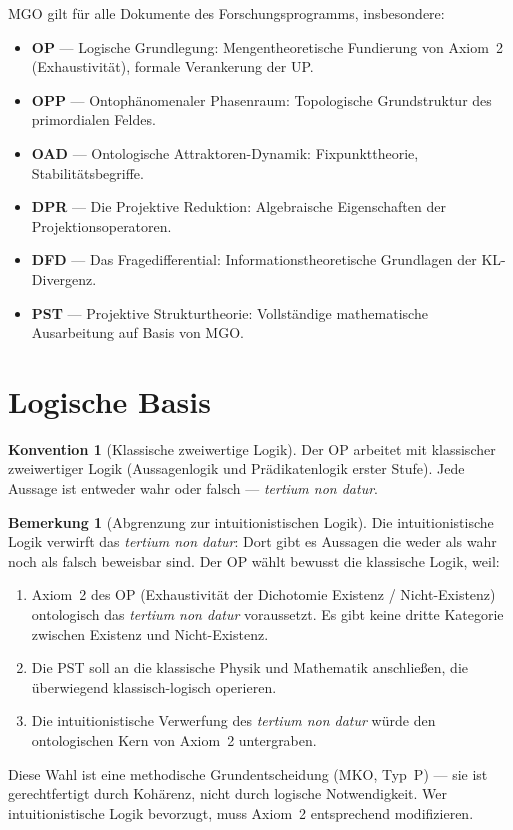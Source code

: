 \documentclass[11pt,a4paper]{article}
\theoremstyle{plain}
\theoremstyle{definition}
\newtheorem{remark}{Bemerkung}[section]
\newtheorem{konvention}{Konvention}[section]
\begin{document}
MGO gilt f\"{u}r alle Dokumente des Forschungsprogramms, insbesondere:
\begin{itemize}
  \item \textbf{OP} --- Logische Grundlegung: Mengentheoretische Fundierung von
        Axiom~2 (Exhaustivit\"{a}t), formale Verankerung der UP.
  \item \textbf{OPP} --- Ontoph\"{a}nomenaler Phasenraum: Topologische Grundstruktur
        des primordialen Feldes.
  \item \textbf{OAD} --- Ontologische Attraktoren-Dynamik: Fixpunkttheorie,
        Stabilit\"{a}tsbegriffe.
  \item \textbf{DPR} --- Die Projektive Reduktion: Algebraische Eigenschaften der
        Projektionsoperatoren.
  \item \textbf{DFD} --- Das Fragedifferential: Informationstheoretische Grundlagen
        der KL-Divergenz.
  \item \textbf{PST} --- Projektive Strukturtheorie: Vollst\"{a}ndige mathematische
        Ausarbeitung auf Basis von MGO.
\end{itemize}

\section{Logische Basis}

\begin{konvention}[Klassische zweiwertige Logik]
Der OP arbeitet mit klassischer zweiwertiger Logik (Aussagenlogik und
Pr\"{a}dikatenlogik erster Stufe). Jede Aussage ist entweder wahr oder falsch ---
\emph{tertium non datur}.
\end{konvention}

\begin{remark}[Abgrenzung zur intuitionistischen Logik]
Die intuitionistische Logik verwirft das \emph{tertium non datur}: Dort gibt es
Aussagen die weder als wahr noch als falsch beweisbar sind. Der OP w\"{a}hlt bewusst
die klassische Logik, weil:

\begin{enumerate}
  \item Axiom~2 des OP (Exhaustivit\"{a}t der Dichotomie Existenz / Nicht-Existenz)
        ontologisch das \emph{tertium non datur} voraussetzt. Es gibt keine dritte
        Kategorie zwischen Existenz und Nicht-Existenz.
  \item Die PST soll an die klassische Physik und Mathematik anschlie\ss{}en, die
        \"{u}berwiegend klassisch-logisch operieren.
  \item Die intuitionistische Verwerfung des \emph{tertium non datur} w\"{u}rde den
        ontologischen Kern von Axiom~2 untergraben.
\end{enumerate}

Diese Wahl ist eine methodische Grundentscheidung (MKO, Typ~P) --- sie ist
gerechtfertigt durch Koh\"{a}renz, nicht durch logische Notwendigkeit. Wer
intuitionistische Logik bevorzugt, muss Axiom~2 entsprechend modifizieren.
\end{remark}
\end{document}
